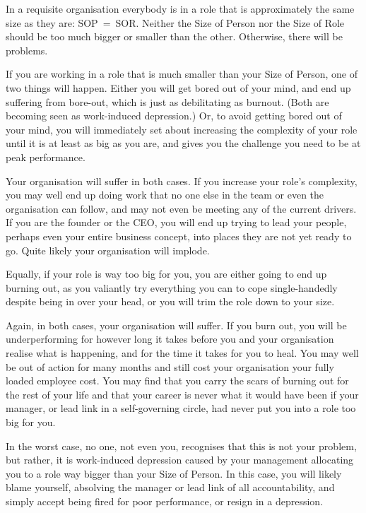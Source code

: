 In a requisite organisation everybody is in a role that is approximately the same size as they are: SOP~=~SOR. Neither the Size of Person nor the Size of Role should be too much bigger or smaller than the other. Otherwise, there will be problems.


If you are working in a role that is much smaller than your Size of Person,  one of two things will happen. Either you will get bored out of your mind, and end up suffering from bore-out, which is just as debilitating as burnout. (Both are becoming seen as work-induced depression.) Or, to avoid getting bored out of your mind, you will immediately set about increasing the complexity of your role until it is at least as big as you are, and gives you the challenge you need to be at peak performance.


Your organisation will suffer in both cases. If you increase your role’s complexity, you may well end up doing work that no one else in the team or even the organisation can follow, and may not even be meeting any of the current drivers. If you are the founder or the CEO, you will end up trying to lead your people, perhaps even your entire business concept, into places they are not yet ready to go. Quite likely your organisation will implode.


Equally, if your role is way too big for you, you are either going to end up burning out, as you valiantly try everything you can to cope single-handedly despite being in over your head, or you will trim the role down to your size.


Again, in both cases, your organisation will suffer. If you burn out, you will be underperforming for however long it takes before you and your organisation realise what is happening, and for the time it takes for you to heal. You may well be out of action for many months and still cost your organisation your fully loaded employee cost. You may find that you carry the scars of burning out for the rest of your life and that your career is never what it would have been if your manager, or lead link in a self-governing circle, had never put you into a role too big for you. 


In the worst case, no one, not even you, recognises that this is not your problem, but rather, it is work-induced depression caused by your management allocating you to a role way bigger than your Size of Person.  In this case, you will likely blame yourself, absolving the manager or lead link of all accountability, and simply accept being fired for poor performance, or resign in a depression. 


